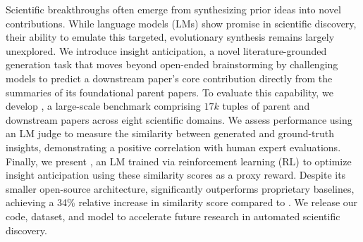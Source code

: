 Scientific breakthroughs often emerge from synthesizing prior ideas into novel contributions. While language models (LMs) show promise in scientific discovery, their ability to emulate this targeted, evolutionary synthesis remains largely unexplored. We introduce insight anticipation, a novel literature-grounded generation task that moves beyond open-ended brainstorming by challenging models to predict a downstream paper's core contribution directly from the summaries of its foundational parent papers. To evaluate this capability, we develop \ourbenchmark{}, a large-scale benchmark comprising $17k$ tuples of parent and downstream papers across eight scientific domains. We assess performance using an LM judge to measure the similarity between generated and ground-truth insights, demonstrating a positive correlation with human expert evaluations. Finally, we present \ourmethod{}, an LM trained via reinforcement learning (RL) to optimize insight anticipation using these similarity scores as a proxy reward. Despite its smaller open-source architecture, \ourmethod{} significantly outperforms proprietary baselines, achieving a 34\% relative increase in similarity score compared to \gemthreepro{}. We release our code, dataset, and model to accelerate future research in automated scientific discovery.